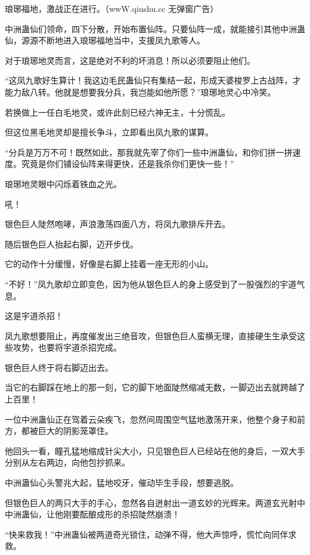 
\begin{this_body}

琅琊福地，激战正在进行。（wwW.qiushu.cc 无弹窗广告）

中洲蛊仙们领命，四下分散，开始布置仙阵。只要仙阵一成，就能接引其他中洲蛊仙，源源不断地进入琅琊福地当中，支援凤九歌等人。

对于琅琊地灵而言，这是绝对不利的坏消息！所以必须要阻止他们。

“这凤九歌好生算计！我这边毛民蛊仙只有集结一起，形成天婆梭罗上古战阵，才能力敌八转。他就是想要我分兵，我岂能如他所愿？”琅琊地灵心中冷笑。

若换做上一任白毛地灵，或许此刻已经六神无主，十分慌乱。

但这位黑毛地灵却是擅长争斗，立即看出凤九歌的谋算。

“分兵是万万不可！既然如此，那我就先宰了你们一些中洲蛊仙，和你们拼一拼速度。究竟是你们铺设仙阵来得更快，还是我杀你们更快一些！”

琅琊地灵眼中闪烁着铁血之光。

吼！

银色巨人陡然咆哮，声浪激荡四面八方，将凤九歌排斥开去。

随后银色巨人抬起右脚，迈开步伐。

它的动作十分缓慢，好像是右脚上挂着一座无形的小山。

“不好！”凤九歌却立即变色，因为他从银色巨人的身上感受到了一股强烈的宇道气息。

这是宇道杀招！

凤九歌想要阻止，再度催发出三绝音攻，但银色巨人蛮横无理，直接硬生生承受这些攻势，也要将宇道杀招完成。

银色巨人终于将右脚迈出去。

当它的右脚踩在地上的那一刻，它的脚下地面陡然缩减无数，一脚迈出去就跨越了上百里！

一位中洲蛊仙正在驾着云朵疾飞，忽然间周围空气猛地激荡开来，他整个身子和前方，都被巨大的阴影笼罩住。

他回头一看，瞳孔猛地缩成针尖大小，只见银色巨人已经站在他的身后，一双大手分别从左右两边，向他包抄抓来。

中洲蛊仙心头警兆大起，猛地咬牙，催动毕生手段，想要逃脱。

但银色巨人的两只大手的手心，忽然各自迸射出一道玄妙的光辉来。两道玄光射中中洲蛊仙，让他刚要酝酿成形的杀招陡然崩溃！

“快来救我！”中洲蛊仙被两道奇光锁住，动弹不得，他大声惊呼，慌忙向同伴求救。


\end{this_body}
